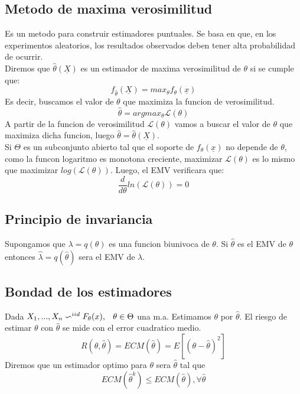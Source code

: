 \documentclass[titlepage,a4paper]{article}
\begin{document}
\subsection{Metodo de maxima verosimilitud}
Es un metodo para construir estimadores puntuales. Se basa en que, en los experimentos aleatorios, los resultados observados deben tener alta probabilidad de ocurrir.\\
Diremos que $\hat{\theta}(\underline{X})$ es un estimador de maxima verosimilitud de $\theta$ si se cumple que:
\begin{equation*}
    f_{\hat{\theta}}(\underline{X}) = max_{\theta}f_{\theta}(\underline{x})
\end{equation*}
Es decir, buscamos el valor de $\theta$ que maximiza la funcion de verosimilitud.
\begin{equation*}
    \hat{\theta} = argmax_{\theta} \mathcal{L}(\theta)
\end{equation*}
A partir de la funcion de verosimilitud $\mathcal{L}(\theta)$ vamos a buscar el valor de $\theta$ que maximiza dicha funcion, luego $\hat{\theta} = \hat{\theta}(\underline{X})$.\\
Si $\Theta$ es un subconjunto abierto tal que el soporte de $f_{\theta}(\underline{x})$ no depende de $\theta$, como la funcon logaritmo es monotona creciente, maximizar $\mathcal{L}(\theta)$ es lo mismo que maximizar $log(\mathcal{L}(\theta))$. Luego, el EMV verificara que:
\begin{equation*}
    \frac{d}{d\theta} ln(\mathcal{L}(\theta)) = 0
\end{equation*}
\subsection{Principio de invariancia}
Supongamos que $\lambda = q(\theta)$ es una funcion biunivoca de $\theta$. Si $\hat{\theta}$ es el EMV de $\theta$ entonces $\hat{\lambda} = q(\hat{\theta})$ sera el EMV de $\lambda$.
\subsection{Bondad de los estimadores}
Dada $X_{1},...,X_{n} \backsim^{iid} F_{\theta}(x), \hspace{8px} \theta \in \Theta$ una m.a. Estimamos $\theta$ por $\hat{\theta}$. El riesgo de estimar $\theta$ con $\hat{\theta}$ se mide con el error cuadratico medio.
\begin{equation*}
    R(\theta,\hat{\theta}) = ECM(\hat{\theta}) = E [(\theta - \hat{\theta})^{2}]
\end{equation*}
Diremos que un estimador optimo para $\theta$ sera $\hat{\theta}$ tal que 
\begin{equation*}
    ECM(\hat{\theta}^{k}) \leq ECM(\hat{\theta}), \forall \hat{\theta}
\end{equation*}
\end{document}
